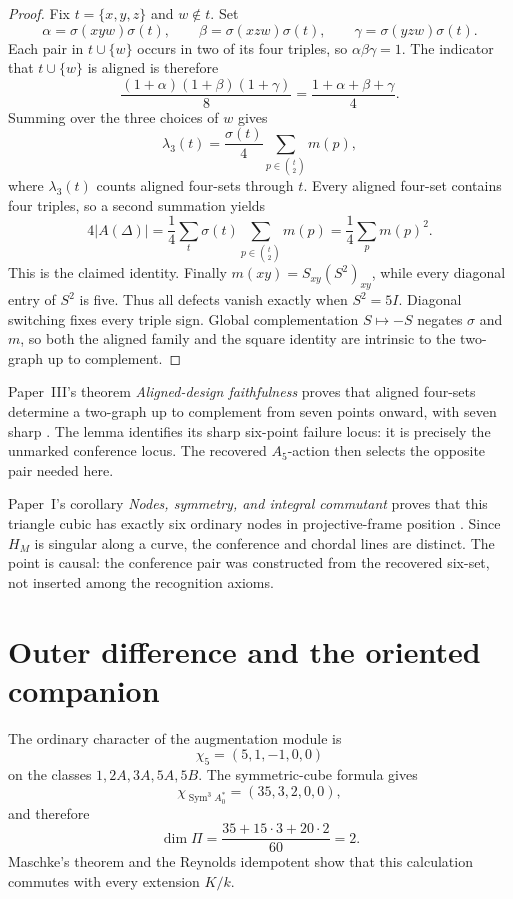 \documentclass[11pt]{article}
\theoremstyle{definition}
\theoremstyle{remark}
\newcommand{\Sym}{\operatorname{Sym}}
\begin{document}
\begin{proof}
Fix \(t=\{x,y,z\}\) and \(w\notin t\).  Set
\[
 \alpha=\sigma(xyw)\sigma(t),\qquad
 \beta=\sigma(xzw)\sigma(t),\qquad
 \gamma=\sigma(yzw)\sigma(t).
\]
Each pair in \(t\cup\{w\}\) occurs in two of its four triples, so
\(\alpha\beta\gamma=1\).  The indicator that \(t\cup\{w\}\) is aligned is
therefore
\[
 \frac{(1+\alpha)(1+\beta)(1+\gamma)}8
   =\frac{1+\alpha+\beta+\gamma}{4}.
\]
Summing over the three choices of \(w\) gives
\[
 \lambda_3(t)
   =\frac{\sigma(t)}4\sum_{p\in\binom t2}m(p),
\]
where \(\lambda_3(t)\) counts aligned four-sets through \(t\).  Every aligned
four-set contains four triples, so a second summation yields
\[
4|A(\Delta)|
  =\frac14\sum_t\sigma(t)\sum_{p\in\binom t2}m(p)
  =\frac14\sum_p m(p)^2.
\]
This is the claimed identity.  Finally
\(m(xy)=S_{xy}(S^2)_{xy}\), while every diagonal entry of \(S^2\) is five.
Thus all defects vanish exactly when \(S^2=5I\).
Diagonal switching fixes every triple sign.  Global complementation
\(S\mapsto-S\) negates \(\sigma\) and \(m\), so both the aligned family and
the square identity are intrinsic to the two-graph up to complement.
\end{proof}

Paper~III's theorem \emph{Aligned-design faithfulness} proves that aligned
four-sets determine a two-graph up to complement from seven points onward,
with seven sharp \cite{RuddPassages2026}.  The lemma identifies its sharp
six-point failure locus: it is precisely the unmarked conference locus.  The
recovered \(A_5\)-action then selects the opposite pair needed here.

Paper~I's corollary \emph{Nodes, symmetry, and integral commutant} proves
that this triangle cubic has exactly six ordinary nodes in projective-frame
position \cite{RuddRigidity2026}.  Since \(H_M\) is singular along a curve,
the conference and chordal lines are distinct.  The point is causal: the
conference pair was constructed from the recovered six-set, not inserted
among the recognition axioms.

\section{Outer difference and the oriented companion}
\label{sec:outer-companion}

The ordinary character of the augmentation module is
\[
                    \chi_5=(5,1,-1,0,0)
\]
on the classes \(1,2A,3A,5A,5B\).  The symmetric-cube formula gives
\[
       \chi_{\Sym^3 A_0^*}=(35,3,2,0,0),
\]
and therefore
\[
 \dim\Pi=\frac{35+15\cdot3+20\cdot2}{60}=2.
\]
Maschke's theorem and the Reynolds idempotent show that this calculation
commutes with every extension \(K/k\).
\end{document}
